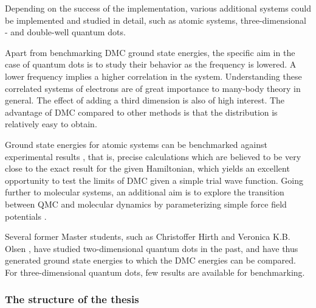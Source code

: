 Depending on the success of the implementation, various additional systems could be implemented and studied in detail, such as atomic systems, three-dimensional - and double-well quantum dots. 

Apart from benchmarking DMC ground state energies, the specific aim in the case of quantum dots is to study their behavior as the frequency is lowered. A lower frequency implies a higher correlation in the system. Understanding these correlated systems of electrons are of great importance to many-body theory in general. The effect of adding a third dimension is also of high interest. The advantage of DMC compared to other methods is that the distribution is relatively easy to obtain.

Ground state energies for atomic systems can be benchmarked against experimental results \cite{H_He_exact, ExactMolecules, AtomsExact, KryptonExact}, that is, precise calculations which are believed to be very close to the exact result for the given Hamiltonian, which yields an excellent opportunity to test the limits of DMC given a simple trial wave function. Going further to molecular systems, an additional aim is to explore the transition between QMC and molecular dynamics by parameterizing simple force field potentials \cite{forcesQMC}.

Several former Master students, such as Christoffer Hirth \cite{Hirth} and Veronica K.B. Olsen \cite{Olsen}, have studied two-dimensional quantum dots in the past, and have thus generated ground state energies to  which the DMC energies can be compared. For three-dimensional quantum dots, few results are available for benchmarking.

\subsubsection{The structure of the thesis}

